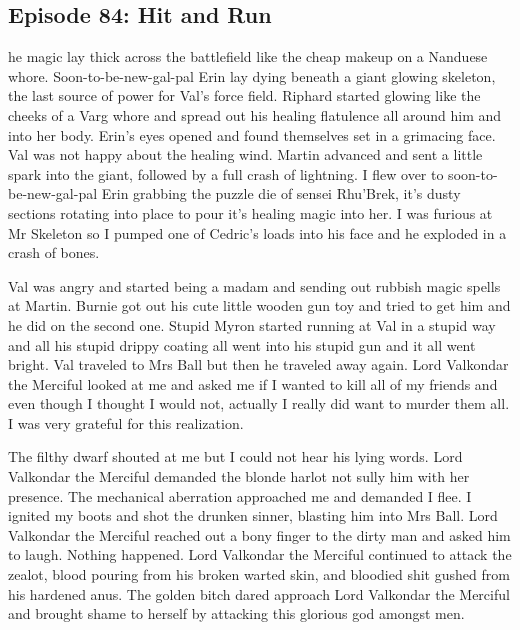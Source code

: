 \subsection{Episode 84: Hit and Run}

he magic lay thick across the battlefield like the cheap makeup on a Nanduese whore. Soon-to-be-new-gal-pal Erin lay dying beneath a giant glowing skeleton, the last source of power for Val’s force field. Riphard started glowing like the cheeks of a Varg whore and spread out his healing flatulence all around him and into her body. Erin’s eyes opened and found themselves set in a grimacing face. Val was not happy about the healing wind. Martin advanced and sent a little spark into the giant, followed by a full crash of lightning. I flew over to soon-to-be-new-gal-pal Erin grabbing the puzzle die of sensei Rhu’Brek, it’s dusty sections rotating into place to pour it’s healing magic into her. I was furious at Mr Skeleton so I pumped one of Cedric’s loads into his face and he exploded in a crash of bones.\medskip

Val was angry and started being a madam and sending out rubbish magic spells at Martin. Burnie got out his cute little wooden gun toy and tried to get him and he did on the second one. Stupid Myron started running at Val in a stupid way and all his stupid drippy coating all went into his stupid gun and it all went bright. Val traveled to Mrs Ball but then he traveled away again. Lord Valkondar the Merciful looked at me and asked me if I wanted to kill all of my friends and even though I thought I would not, actually I really did want to murder them all. I was very grateful for this realization.\medskip

The filthy dwarf shouted at me but I could not hear his lying words. Lord Valkondar the Merciful demanded the blonde harlot not sully him with her presence. The mechanical aberration approached me and demanded I flee. I ignited my boots and shot the drunken sinner, blasting him into Mrs Ball. Lord Valkondar the Merciful reached out a bony finger to the dirty man and asked him to laugh. Nothing happened. Lord Valkondar the Merciful continued to attack the zealot, blood pouring from his broken warted skin, and bloodied shit gushed from his hardened anus. The golden bitch dared approach Lord Valkondar the Merciful and brought shame to herself by attacking this glorious god amongst men.\medskip

